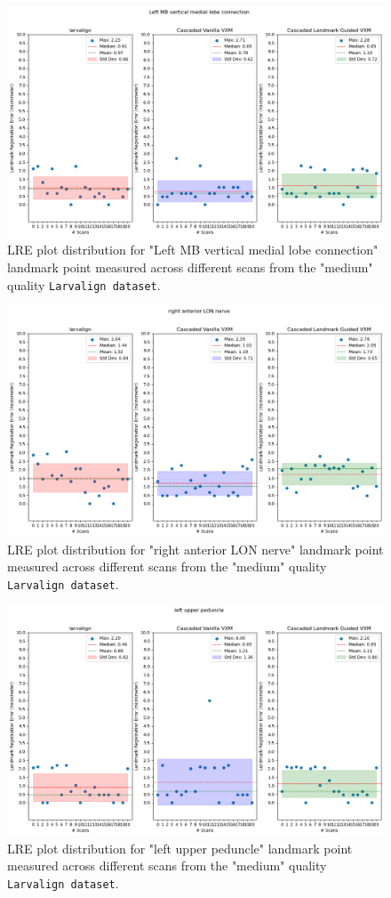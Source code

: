 	\begin{figure}[h!]
		\centering
		\includegraphics[width=0.75\columnwidth]{resources/chapter5_fresh/output/Left MB vertical medial lobe connection.png}
		\caption{LRE plot distribution for "Left MB vertical medial lobe connection" landmark point measured across different scans from the "medium" quality \texttt{Larvalign dataset}.}
		\label{fig:landmark12}
	\end{figure}

	\begin{figure}[h!]
		\centering
		\includegraphics[width=0.75\columnwidth]{resources/chapter5_fresh/output/right anterior LON nerve.png}
		\caption{LRE plot distribution for "right anterior LON nerve" landmark point measured across different scans from the "medium" quality \texttt{Larvalign dataset}.}
		\label{fig:landmark13}
	\end{figure}

	\begin{figure}[h!]
		\centering
		\includegraphics[width=0.75\columnwidth]{resources/chapter5_fresh/output/left upper peduncle.png}
		\caption{LRE plot distribution for "left upper peduncle" landmark point measured across different scans from the "medium" quality \texttt{Larvalign dataset}.}
		\label{fig:landmark14}
	\end{figure}

